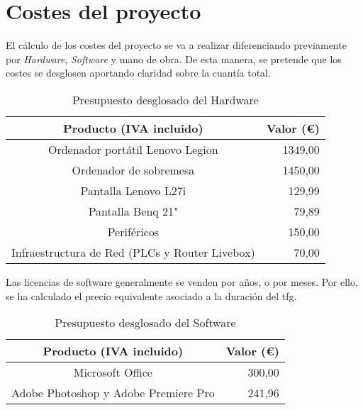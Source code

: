 \section{Costes del proyecto}

El cálculo de los costes del proyecto se va a realizar diferenciando previamente por \textit{Hardware}, \textit{Software} y mano de obra. De esta manera, se pretende que los costes se desglosen aportando claridad sobre la cuantía total. 

\vspace{0.5cm}

\begin{table}[ht]
\centering
\begin{tabular}{|c|r|}
\hline
\rowcolor[HTML]{EFEFEF} 
\textbf{Producto (IVA incluido)}              & \multicolumn{1}{c|}{\cellcolor[HTML]{EFEFEF}\textbf{Valor (€)}} \\ \hline
Ordenador portátil Lenovo Legion              & 1349,00                                                         \\ \hline
Ordenador de sobremesa                        & 1450,00                                                         \\ \hline
Pantalla Lenovo L27i                          & 129,99                                                          \\ \hline
Pantalla Benq 21"                             & 79,89                                                           \\ \hline
Periféricos                                   & 150,00                                                          \\ \hline
Infraestructura de Red (PLCs y Router Livebox) & 70,00                                                           \\ \hline
\end{tabular}
\caption{Presupuesto desglosado del Hardware}
\label{tab:costesHardware}
\end{table}

\vspace{0.5cm}

Las licencias de software generalmente se venden por años, o por meses. Por ello, se ha calculado el precio equivalente asociado a la duración del \gls{tfg}.

\vspace{0.5cm}

\begin{table}[ht]
\centering
\begin{tabular}{|c|r|}
\hline
\rowcolor[HTML]{EFEFEF} 
\textbf{Producto (IVA incluido)}     & \multicolumn{1}{c|}{\cellcolor[HTML]{EFEFEF}\textbf{Valor (€)}} \\ \hline
Microsoft Office                     & 300,00                                                          \\ \hline
Adobe Photoshop y Adobe Premiere Pro & 241,96‬                                                         \\ \hline
\end{tabular}
\caption{Presupuesto desglosado del Software}
\label{tab:costesSoftware}
\end{table}

